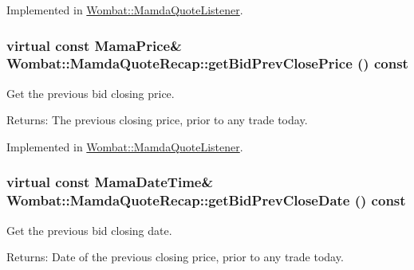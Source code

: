 Implemented in \hyperlink{classWombat_1_1MamdaQuoteListener_8b67bfdd143925309c46e4bb86a5a53f}{Wombat::Mamda\-Quote\-Listener}.\hypertarget{classWombat_1_1MamdaQuoteRecap_5a0ba795de4b02302093d082484030f8}{
\subsubsection[getBidPrevClosePrice]{\setlength{\rightskip}{0pt plus 5cm}virtual const Mama\-Price\& Wombat::Mamda\-Quote\-Recap::get\-Bid\-Prev\-Close\-Price () const}}
\label{classWombat_1_1MamdaQuoteRecap_5a0ba795de4b02302093d082484030f8}


Get the previous bid closing price. 

\begin{Desc}
\item[Returns:]The previous closing price, prior to any trade today. \end{Desc}


Implemented in \hyperlink{classWombat_1_1MamdaQuoteListener_637f9ad1c4a4523725dd5b9f12da169e}{Wombat::Mamda\-Quote\-Listener}.\hypertarget{classWombat_1_1MamdaQuoteRecap_2695af7f24f5782cf586e354eefe41fe}{
\subsubsection[getBidPrevCloseDate]{\setlength{\rightskip}{0pt plus 5cm}virtual const Mama\-Date\-Time\& Wombat::Mamda\-Quote\-Recap::get\-Bid\-Prev\-Close\-Date () const}}
\label{classWombat_1_1MamdaQuoteRecap_2695af7f24f5782cf586e354eefe41fe}


Get the previous bid closing date. 

\begin{Desc}
\item[Returns:]Date of the previous closing price, prior to any trade today. \end{Desc}


